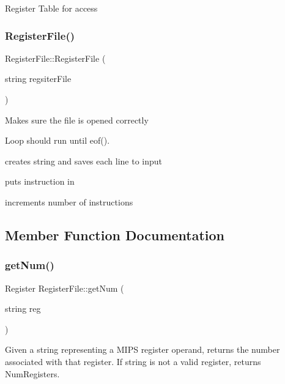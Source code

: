 Register Table for access \mbox{\label{class_register_file_a2bfb1f40fe927673de169aae60ada489}} 
\subsubsection{\texorpdfstring{Register\+File()}{RegisterFile()}\hspace{0.1cm}{\footnotesize\ttfamily [2/2]}}
{\footnotesize\ttfamily Register\+File\+::\+Register\+File (\begin{DoxyParamCaption}\item[{string}]{regsiter\+File }\end{DoxyParamCaption})}

Makes sure the file is opened correctly

Loop should run until eof().

creates string and saves each line to input

puts instruction in

increments number of instructions 

\subsection{Member Function Documentation}
\mbox{\label{class_register_file_a54d87ad82368cfa1dfb8b3f01a3d2e5a}} 
\subsubsection{\texorpdfstring{get\+Num()}{getNum()}}
{\footnotesize\ttfamily Register Register\+File\+::get\+Num (\begin{DoxyParamCaption}\item[{string}]{reg }\end{DoxyParamCaption})}

Given a string representing a M\+I\+PS register operand, returns the number associated with that register. If string is not a valid register, returns Num\+Registers. \mbox{\label{class_register_file_a4e4802bee78d7c7173c829764babca9c}} 

